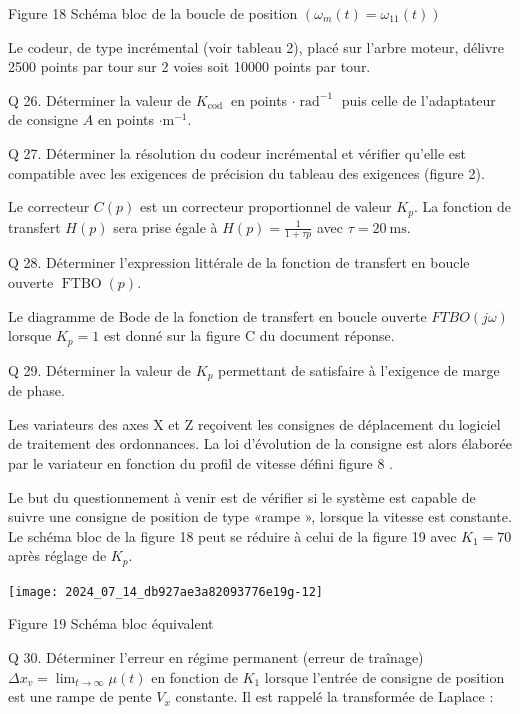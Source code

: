 \documentclass[10pt]{article}
\begin{document}
Figure 18 Schéma bloc de la boucle de position $\left(\omega_{m}(t)=\omega_{11}(t)\right)$

Le codeur, de type incrémental (voir tableau 2), placé sur l'arbre moteur, délivre 2500 points par tour sur 2 voies soit 10000 points par tour.

Q 26. Déterminer la valeur de $K_{\text {cod }}$ en points $\cdot \operatorname{rad}^{-1}$ puis celle de l'adaptateur de consigne $A$ en points $\cdot \mathrm{m}^{-1}$.

Q 27. Déterminer la résolution du codeur incrémental et vérifier qu'elle est compatible avec les exigences de précision du tableau des exigences (figure 2).

Le correcteur $C(p)$ est un correcteur proportionnel de valeur $K_{p}$. La fonction de transfert $H(p)$ sera prise égale à $H(p)=\frac{1}{1+\tau p}$ avec $\tau=20 \mathrm{~ms}$.

Q 28. Déterminer l'expression littérale de la fonction de transfert en boucle ouverte $\operatorname{FTBO}(p)$.

Le diagramme de Bode de la fonction de transfert en boucle ouverte $F T B O(j \omega)$ lorsque $K_{p}=1$ est donné sur la figure C du document réponse.

Q 29. Déterminer la valeur de $K_{p}$ permettant de satisfaire à l'exigence de marge de phase.

Les variateurs des axes X et Z reçoivent les consignes de déplacement du logiciel de traitement des ordonnances. La loi d'évolution de la consigne est alors élaborée par le variateur en fonction du profil de vitesse défini figure 8 .

Le but du questionnement à venir est de vérifier si le système est capable de suivre une consigne de position de type «rampe », lorsque la vitesse est constante. Le schéma bloc de la figure 18 peut se réduire à celui de la figure 19 avec $K_{1}=70$ après réglage de $K_{p}$.

\begin{center}
\texttt{[image: 2024\_07\_14\_db927ae3a82093776e19g-12]}
\end{center}

Figure 19 Schéma bloc équivalent

Q 30. Déterminer l'erreur en régime permanent (erreur de traînage) $\Delta x_{v}=\lim _{t \rightarrow \infty} \mu(t)$ en fonction de $K_{1}$ lorsque l'entrée de consigne de position est une rampe de pente $V_{x}$ constante. Il est rappelé la transformée de Laplace :
\end{document}

